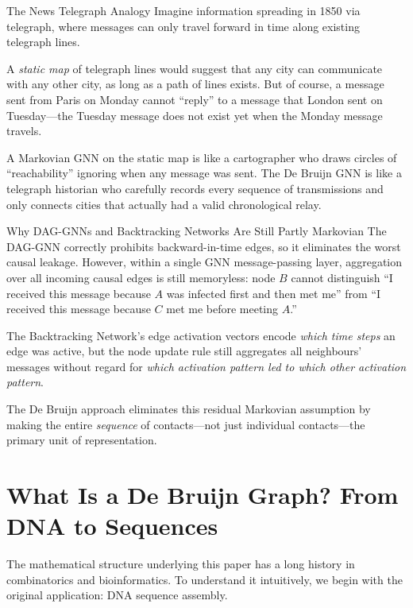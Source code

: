 \begin{analogybox}{The News Telegraph Analogy}
Imagine information spreading in 1850 via telegraph, where messages can only travel forward in
time along existing telegraph lines.

A \emph{static map} of telegraph lines would suggest that any city can communicate with any
other city, as long as a path of lines exists. But of course, a message sent from Paris on
Monday cannot ``reply'' to a message that London sent on Tuesday---the Tuesday message does not
exist yet when the Monday message travels.

A Markovian GNN on the static map is like a cartographer who draws circles of ``reachability''
ignoring when any message was sent. The De Bruijn GNN is like a telegraph historian who carefully
records every sequence of transmissions and only connects cities that actually had a valid
chronological relay.
\end{analogybox}

\begin{mathbox}{Why DAG-GNNs and Backtracking Networks Are Still Partly Markovian}
The DAG-GNN correctly prohibits backward-in-time edges, so it eliminates the worst causal
leakage. However, within a single GNN message-passing layer, aggregation over all incoming causal
edges is still memoryless: node $B$ cannot distinguish ``I received this message because $A$
was infected first and then met me'' from ``I received this message because $C$ met me before
meeting $A$.''

The Backtracking Network's edge activation vectors encode \emph{which time steps} an edge was
active, but the node update rule still aggregates all neighbours' messages without regard for
\emph{which activation pattern led to which other activation pattern}.

The De Bruijn approach eliminates this residual Markovian assumption by making the entire
\emph{sequence} of contacts---not just individual contacts---the primary unit of representation.
\end{mathbox}

\section{What Is a De Bruijn Graph? From DNA to Sequences}

The mathematical structure underlying this paper has a long history in combinatorics and
bioinformatics. To understand it intuitively, we begin with the original application: DNA
sequence assembly.

